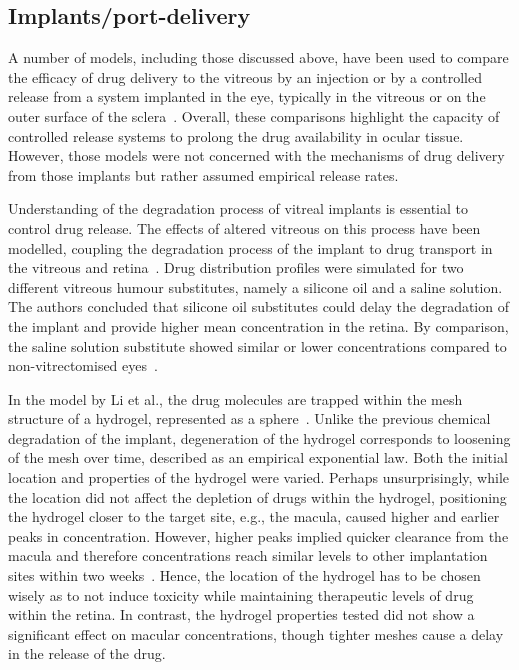 \documentclass{article}
\begin{document}
\subsection{Implants/port-delivery}

A number of models, including those discussed above, have been used to compare the efficacy of drug delivery to the vitreous by an injection or by a controlled release from a system implanted in the eye, typically in the vitreous or on the outer surface of the sclera~\cite{Jooybar_2014,Kathawate_2008,Kavousanakis_2014,Park_2005}.
Overall, these comparisons highlight the capacity of controlled release systems to prolong the drug availability in ocular tissue.
However, those models were not concerned with the mechanisms of drug delivery from those implants but rather assumed empirical release rates.

Understanding of the degradation process of vitreal implants is essential to control drug release.
The effects of altered vitreous on this process have been modelled, coupling the degradation process of the implant to drug transport in the vitreous and retina~\cite{Ferreira_2020}.
Drug distribution profiles were simulated for two different vitreous humour substitutes, namely a silicone oil and a saline solution.
The authors concluded that silicone oil substitutes could delay the degradation of the implant and provide higher mean concentration in the retina.
By comparison, the saline solution substitute showed similar or lower concentrations compared to non-vitrectomised eyes~\cite{Ferreira_2020}.

In the model by Li et al., the drug molecules are trapped within the mesh structure of a hydrogel, represented as a sphere~\cite{Li_2022a}.
Unlike the previous chemical degradation of the implant, degeneration of the hydrogel corresponds to loosening of the mesh over time, described as an empirical exponential law.
Both the initial location and properties of the hydrogel were varied.
Perhaps unsurprisingly, while the location did not affect the depletion of drugs within the hydrogel, positioning the hydrogel closer to the target site, e.g., the macula, caused higher and earlier peaks in concentration.
However, higher peaks implied quicker clearance from the macula and therefore concentrations reach similar levels to other implantation sites within two weeks~\cite{Li_2022a}.
Hence, the location of the hydrogel has to be chosen wisely as to not induce toxicity while maintaining therapeutic levels of drug within the retina.
In contrast, the hydrogel properties tested did not show a significant effect on macular concentrations, though tighter meshes cause a delay in the release of the drug.
\end{document}
